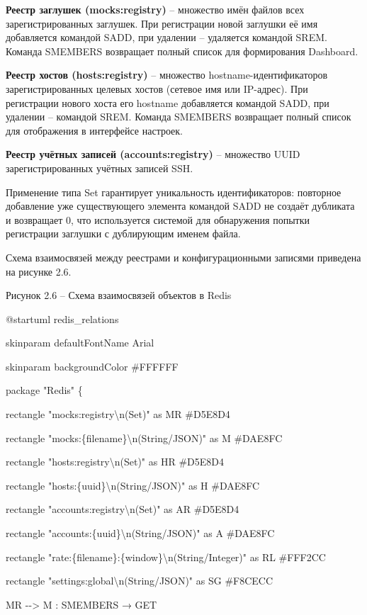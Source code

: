 \documentclass[
]{article}
\begin{document}
\textbf{Реестр заглушек (mocks:registry)} -- множество имён файлов всех
зарегистрированных заглушек. При регистрации новой заглушки её имя
добавляется командой SADD, при удалении -- удаляется командой SREM.
Команда SMEMBERS возвращает полный список для формирования Dashboard.

\textbf{Реестр хостов (hosts:registry)} -- множество
hostname-идентификаторов зарегистрированных целевых хостов (сетевое имя
или IP-адрес). При регистрации нового хоста его hostname добавляется
командой SADD, при удалении -- командой SREM. Команда SMEMBERS
возвращает полный список для отображения в интерфейсе настроек.

\textbf{Реестр учётных записей (accounts:registry)} -- множество UUID
зарегистрированных учётных записей SSH.

Применение типа Set гарантирует уникальность идентификаторов: повторное
добавление уже существующего элемента командой SADD не создаёт дубликата
и возвращает 0, что используется системой для обнаружения попытки
регистрации заглушки с дублирующим именем файла.

Схема взаимосвязей между реестрами и конфигурационными записями
приведена на рисунке 2.6.

Рисунок
2.6 -- Схема взаимосвязей объектов в Redis

@startuml redis\_relations

skinparam defaultFontName Arial

skinparam backgroundColor \#FFFFFF

package "Redis" \{

rectangle "mocks:registry\textbackslash n(Set)" as MR \#D5E8D4

rectangle "mocks:\{filename\}\textbackslash n(String/JSON)" as M
\#DAE8FC

rectangle "hosts:registry\textbackslash n(Set)" as HR \#D5E8D4

rectangle "hosts:\{uuid\}\textbackslash n(String/JSON)" as H \#DAE8FC

rectangle "accounts:registry\textbackslash n(Set)" as AR \#D5E8D4

rectangle "accounts:\{uuid\}\textbackslash n(String/JSON)" as A \#DAE8FC

rectangle "rate:\{filename\}:\{window\}\textbackslash n(String/Integer)"
as RL \#FFF2CC

rectangle "settings:global\textbackslash n(String/JSON)" as SG \#F8CECC

MR -\/-\textgreater{} M : SMEMBERS → GET
\end{document}
